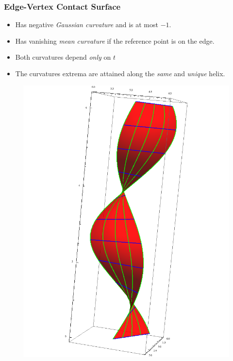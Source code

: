 \documentclass[ucs,9pt,pagenumbersfull]{beamer}
\begin{document}
\begin{frame}
  \frametitle{Edge-Vertex Contact Surface}
  \begin{minipage}{0.63\linewidth}
    \begin{itemize}
    \item Has negative \emph{Gaussian curvature} and is at most \(-1\).
    \item Has vanishing \emph{mean curvature} if the reference point
      is on the edge.
    \item Both curvatures depend \emph{only} on \(t\)
    \item The curvatures extrema are attained along the \emph{same}
      and \emph{unique} helix.
    \end{itemize}

  \end{minipage}
  \hfill
  \begin{minipage}{0.35\linewidth}
    \begin{figure}
      \centering
      \includegraphics[height=0.95\textheight]{Figures/ev-full-contact}
    \end{figure}
  \end{minipage}
\end{frame}
\end{document}

